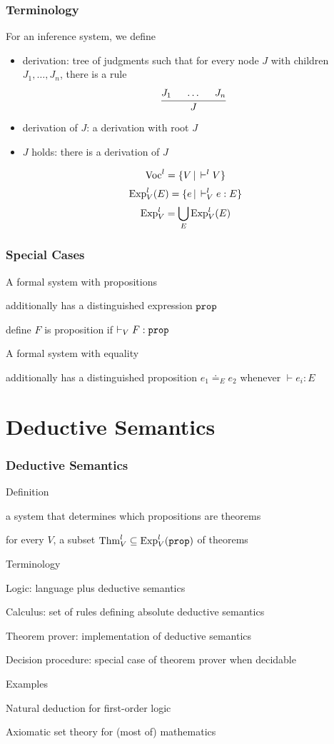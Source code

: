 \begin{frame}\frametitle{Terminology}
For an inference system, we define
\begin{itemize}
\item derivation: tree of judgments such that for every node $J$ with children $J_1,\ldots,J_n$, there is a rule
\[\cfrac{J_1 \hspace*{.5cm} \ldots \hspace*{.5cm} J_n}{J}\,\]
\item derivation of $J$: a derivation with root $J$
\item $J$ holds: there is a derivation of $J$
\end{itemize}
\[\mathrm{Voc}^l = \{V\,|\,\vdash^l V\}\]
\[\mathrm{Exp}^l_V(E) = \{e\,|\,\vdash^l_V e:E\}\]
\[\mathrm{Exp}^l_V = \bigcup_E \mathrm{Exp}^l_V(E)\]
\end{frame}

\begin{frame}\frametitle{Special Cases}
\begin{blockitems}{A formal system with propositions}
\item additionally has a distinguished expression $\prop$
\item define $F$ is proposition if $\vdash_V F:\prop$
\end{blockitems}

\begin{blockitems}{A formal system with equality}
\item additionally has a distinguished proposition $e_1\doteq_E e_2$ whenever $\vdash e_i:E$
\end{blockitems}
\end{frame}

\section{Deductive Semantics}

\begin{frame}\frametitle{Deductive Semantics}
\begin{blockitems}{Definition}
\item a system that determines which propositions are theorems
\item for every $V$, a subset $\Thm^l_V\sq \Exp^l_V(\prop)$ of theorems
\end{blockitems}

\begin{blockitems}{Terminology}
\item Logic: language plus deductive semantics
\item Calculus: set of rules defining absolute deductive semantics
\item Theorem prover: implementation of deductive semantics
\item Decision procedure: special case of theorem prover when decidable
\end{blockitems}

\begin{blockitems}{Examples}
\item Natural deduction for first-order logic
\item Axiomatic set theory for (most of) mathematics
\end{blockitems}
\end{frame}

